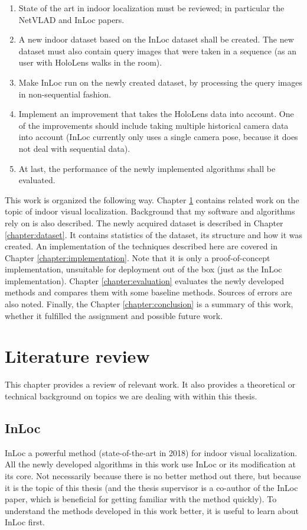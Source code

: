 \documentclass[twoside]{ctuthesis}
\theoremstyle{plain}
\theoremstyle{definition}
\theoremstyle{note}
\begin{document}
\begin{enumerate}
	\item State of the art in indoor localization must be reviewed; in particular the NetVLAD \cite{Arandjelovic16} and InLoc \cite{taira2018inloc} papers.
	\item A new indoor dataset based on the InLoc dataset \cite{taira2018inloc} shall be created. The new dataset must also contain query images that were taken in a sequence (as an user with HoloLens walks in the room).
	\item Make InLoc run on the newly created dataset, by processing the query images in non-sequential fashion.
	\item Implement an improvement that takes the HoloLens data into account. One of the improvements should include taking multiple historical camera data into account (InLoc currently only uses a single camera pose, because it does not deal with sequential data).
	\item At last, the performance of the newly implemented algorithms shall be evaluated.
\end{enumerate}

This work is organized the following way. Chapter \ref{chapter:literature-review} contains related work on the topic of indoor visual localization. Background that my software and algorithms rely on is also described. The newly acquired dataset is described in Chapter \ref{chapter:dataset}. It contains statistics of the dataset, its structure and how it was created. An implementation of the techniques described here are covered in Chapter \ref{chapter:implementation}. Note that it is only a proof-of-concept implementation, unsuitable for deployment out of the box (just as the InLoc implementation). Chapter \ref{chapter:evaluation} evaluates the newly developed methods and compares them with some baseline methods. Sources of errors are also noted. Finally, the Chapter \ref{chapter:conclusion} is a summary of this work, whether it fulfilled the assignment and possible future work.

\chapter{Literature review}
\label{chapter:literature-review}

This chapter provides a review of relevant work. It also provides a theoretical or technical background on topics we are dealing with within this thesis.

\section{InLoc}
InLoc \cite{taira2018inloc} a powerful method (state-of-the-art in 2018) for indoor visual localization. All the newly developed algorithms in this work use InLoc or its modification at its core. Not necessarily because there is no better method out there, but because it is the topic of this thesis (and the thesis supervisor is a co-author of the InLoc paper, which is beneficial for getting familiar with the method quickly). To understand the methods developed in this work better, it is useful to learn about InLoc first.
\end{document}
